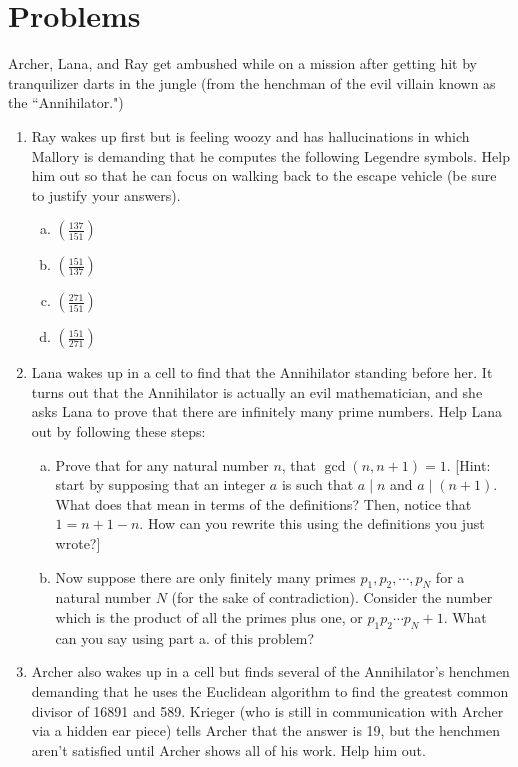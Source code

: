 \documentclass[12pt]{amsart}
\theoremstyle{plain}
\theoremstyle{definition}
\begin{document}
\section{Problems}
Archer, Lana, and Ray get ambushed while on a mission after getting hit by tranquilizer darts in the jungle (from the henchman of the evil villain known as the ``Annihilator.")\\

\begin{enumerate}[1.]
	\item Ray wakes up first but is feeling woozy and has hallucinations in which Mallory is demanding that he computes the following Legendre symbols.  Help him out so that he can focus on walking back to the escape vehicle (be sure to justify your answers).
		\begin{enumerate}[a.]
			\item $\left(\frac{137}{151}\right)$
			\item $\left(\frac{151}{137}\right)$
			\item $\left(\frac{271}{151}\right)$
			\item $\left(\frac{151}{271}\right)$\\
		\end{enumerate}
	\item Lana wakes up in a cell to find that the Annihilator standing before her.  It turns out that the Annihilator is actually an evil mathematician, and she asks Lana to prove that there are infinitely many prime numbers.  Help Lana out by following these steps:
		\begin{enumerate}[a.]
			\item Prove that for any natural number $n$, that $\gcd(n,n+1) = 1$.  [Hint: start by supposing that an integer $a$ is such that $a \mid n$ and $a \mid (n+1)$.  What does that mean in terms of the definitions?  Then, notice that $1 = n+1-n.$  How can you rewrite this using the definitions you just wrote?]\\
			\item Now suppose there are only finitely many primes $p_1, p_2, \cdots, p_N$ for a natural number $N$ (for the sake of contradiction).  Consider the number which is the product of all the primes plus one, or $p_1p_2\cdots p_N+1$.  What can you say using part a. of this problem?\\
		\end{enumerate}
	\item Archer also wakes up in a cell but finds several of the Annihilator's henchmen demanding that he uses the Euclidean algorithm to find the greatest common divisor of 16891 and 589.  Krieger (who is still in communication with Archer via a hidden ear piece) tells Archer that the answer is 19, but the henchmen aren't satisfied until Archer shows all of his work.  Help him out.\\
	

\end{enumerate}
\end{document}
